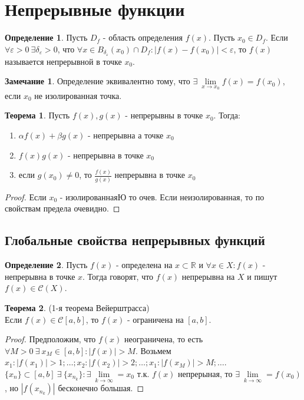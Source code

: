 \documentclass[a4paper, 12pt]{article}
\newcommand{\R}{\mathbb{R}}
\renewcommand{\epsilon}{\varepsilon}
\theoremstyle{definition}
\newtheorem*{definition}{Определение}
\newtheorem*{theorem}{Теорема}
\newtheorem*{comm}{Замечание}
\begin{document}
        \section{Непрерывные функции}
        \begin{definition}
            Пусть $D_f$ - область определения $f(x)$. Пусть $x_0\in D_f$. Если $\forall \epsilon>0\ \exists \delta_{\epsilon}>0$, что $\forall x\in B_{\delta_{\epsilon}}(x_0)\cap D_f: |f(x)-f(x_0)|<\epsilon$, то $f(x)$ называется непрерывной в точке $x_0$.
        \end{definition}  
        \begin{comm}
            Определение эквивалентно тому, что $\exists\ \lim\limits_{x\to x_0}f(x)=f(x_0)$, если $x_0$ не изолированная точка.
        \end{comm} 
        \begin{theorem}
            Пусть $f(x),g(x)$ - непрерывны в точке $x_0$. Тогда:
            \begin{enumerate}
                \item $\alpha f(x)+\beta g(x)$ - непрерывна а точке $x_0$
                \item $f(x)g(x)$ - непрерывна в точке $x_0$
                \item если $g(x_0)\ne 0$, то $\frac{f(x)}{g(x)}$ непрерывна в точке $x_0$
            \end{enumerate}
        \end{theorem} 
        \begin{proof}
            Если $x_0$ - изолированнаяЮ то очев. Если неизолированная, то по свойствам предела очевидно.
        \end{proof} 
        \subsection{Глобальные свойства непрерывных функций}
        \begin{definition}
            Пусть $f(x)$ - определена на $x\subset \R$ и $\forall x\in X: f(x)$ - непрерывна в точке $x$. Тогда говорят, что $f(x)$ непрерывна на $X$ и пишут $f(x)\in \mathcal{C}(X)$.
        \end{definition} 
        \begin{theorem} (1-я теорема Вейерштрасса)\\
            Если $f(x)\in \mathcal{C}[a,b]$, то $f(x)$ - ограничена на $[a,b]$.
        \end{theorem} 
        \begin{proof}
            Предположим, что $f(x)$ неограничена, то есть $\forall M>0\ \exists\ x_M\in [a,b]: |f(x)|>M$. Возьмем $x_1: |f(x_1)|>1;\dots;x_2: |f(x_2)|>2; \dots; x_1: |f(x_M)|>M;\dots$. $\{x_n\}\subset [a,b]\ \exists\ \{x_{n_k}\}: \exists\ \lim\limits_{k\to \infty}=x_0$ т.к. $f(x)$ непрерыная, то $\exists\ \lim\limits_{k\to \infty}=f(x_0)$, но $|f(x_{n_k})|$ бесконечно большая.
        \end{proof} 
\end{document}
